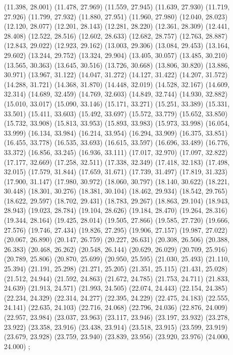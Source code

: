 {  (11.398, 28.001)
  (11.478, 27.969)
  (11.559, 27.945)
  (11.639, 27.930)
  (11.719, 27.926)
  (11.799, 27.932)
  (11.880, 27.951)
  (11.960, 27.980)
  (12.040, 28.023)
  (12.120, 28.077)
  (12.201, 28.143)
  (12.281, 28.220)
  (12.361, 28.309)
  (12.441, 28.408)
  (12.522, 28.516)
  (12.602, 28.633)
  (12.682, 28.757)
  (12.763, 28.887)
  (12.843, 29.022)
  (12.923, 29.162)
  (13.003, 29.306)
  (13.084, 29.453)
  (13.164, 29.602)
  (13.244, 29.752)
  (13.324, 29.904)
  (13.405, 30.057)
  (13.485, 30.210)
  (13.565, 30.363)
  (13.645, 30.516)
  (13.726, 30.668)
  (13.806, 30.820)
  (13.886, 30.971)
  (13.967, 31.122)
  (14.047, 31.272)
  (14.127, 31.422)
  (14.207, 31.572)
  (14.288, 31.721)
  (14.368, 31.870)
  (14.448, 32.019)
  (14.528, 32.167)
  (14.609, 32.314)
  (14.689, 32.459)
  (14.769, 32.603)
  (14.849, 32.744)
  (14.930, 32.882)
  (15.010, 33.017)
  (15.090, 33.146)
  (15.171, 33.271)
  (15.251, 33.389)
  (15.331, 33.501)
  (15.411, 33.603)
  (15.492, 33.697)
  (15.572, 33.779)
  (15.652, 33.850)
  (15.732, 33.908)
  (15.813, 33.953)
  (15.893, 33.983)
  (15.973, 33.998)
  (16.054, 33.999)
  (16.134, 33.984)
  (16.214, 33.954)
  (16.294, 33.909)
  (16.375, 33.851)
  (16.455, 33.778)
  (16.535, 33.693)
  (16.615, 33.597)
  (16.696, 33.489)
  (16.776, 33.372)
  (16.856, 33.245)
  (16.936, 33.111)
  (17.017, 32.970)
  (17.097, 32.822)
  (17.177, 32.669)
  (17.258, 32.511)
  (17.338, 32.349)
  (17.418, 32.183)
  (17.498, 32.015)
  (17.579, 31.844)
  (17.659, 31.671)
  (17.739, 31.497)
  (17.819, 31.323)
  (17.900, 31.147)
  (17.980, 30.972)
  (18.060, 30.797)
  (18.140, 30.622)
  (18.221, 30.448)
  (18.301, 30.276)
  (18.381, 30.104)
  (18.462, 29.934)
  (18.542, 29.765)
  (18.622, 29.597)
  (18.702, 29.431)
  (18.783, 29.267)
  (18.863, 29.104)
  (18.943, 28.943)
  (19.023, 28.784)
  (19.104, 28.626)
  (19.184, 28.470)
  (19.264, 28.316)
  (19.344, 28.164)
  (19.425, 28.014)
  (19.505, 27.866)
  (19.585, 27.720)
  (19.666, 27.576)
  (19.746, 27.434)
  (19.826, 27.295)
  (19.906, 27.157)
  (19.987, 27.022)
  (20.067, 26.890)
  (20.147, 26.759)
  (20.227, 26.631)
  (20.308, 26.506)
  (20.388, 26.383)
  (20.468, 26.262)
  (20.548, 26.144)
  (20.629, 26.029)
  (20.709, 25.916)
  (20.789, 25.806)
  (20.870, 25.699)
  (20.950, 25.595)
  (21.030, 25.493)
  (21.110, 25.394)
  (21.191, 25.298)
  (21.271, 25.205)
  (21.351, 25.115)
  (21.431, 25.028)
  (21.512, 24.944)
  (21.592, 24.863)
  (21.672, 24.785)
  (21.753, 24.711)
  (21.833, 24.639)
  (21.913, 24.571)
  (21.993, 24.505)
  (22.074, 24.443)
  (22.154, 24.385)
  (22.234, 24.329)
  (22.314, 24.277)
  (22.395, 24.229)
  (22.475, 24.183)
  (22.555, 24.141)
  (22.635, 24.103)
  (22.716, 24.068)
  (22.796, 24.036)
  (22.876, 24.009)
  (22.957, 23.984)
  (23.037, 23.963)
  (23.117, 23.946)
  (23.197, 23.932)
  (23.278, 23.922)
  (23.358, 23.916)
  (23.438, 23.914)
  (23.518, 23.915)
  (23.599, 23.919)
  (23.679, 23.928)
  (23.759, 23.940)
  (23.839, 23.956)
  (23.920, 23.976)
  (24.000, 24.000)
};
